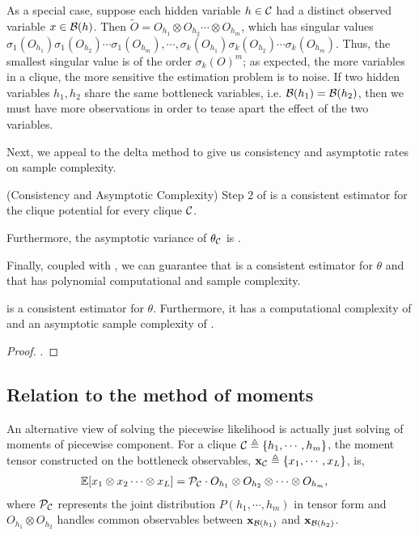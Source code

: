 As a special case, suppose each hidden variable $h \in \mathcal{C}$ had
  a distinct observed variable $x \in \mathcal{B}(h)$. 
Then $\tilde O = O_{h_1} \otimes O_{h_2} \cdots \otimes O_{h_m}$, which
  has singular values $\sigma_1(O_{h_1}) \sigma_1(O_{h_2}) \cdots
  \sigma_1(O_{h_m}), \cdots, \sigma_k(O_{h_1}) \sigma_k(O_{h_2}) \cdots
  \sigma_k(O_{h_m})$. 
Thus, the smallest singular value is of the order $\sigma_k(O)^m$; as
  expected, the more variables in a clique, the more sensitive the
  estimation problem is to noise.
If two hidden variables $h_1, h_2$ share the same bottleneck
  variables, i.e. $\mathcal{B}(h_1) = \mathcal{B}(h_2)$, then we must have more
  observations in order to tease apart the effect of the two
  variables\verify\reword.


Next, we appeal to the delta method to give us
  consistency and asymptotic rates on sample complexity.
\begin{corollary}(Consistency and Asymptotic Complexity)
  \label{cor:asymptotics}
  Step 2 of  is a consistent estimator for
  the clique potential for every clique $\mathcal{C}$.

  Furthermore, the asymptotic variance of $\theta_{\mathcal{C}}$ is
  .
\end{corollary}

Finally, coupled with , we can guarantee that
   is a consistent estimator for $\theta$ and 
  that has polynomial computational and sample complexity.
\begin{theorem}
   is a consistent estimator for $\theta$.
  Furthermore, it has a computational complexity of  and an
    asymptotic sample complexity of .
\end{theorem}
\begin{proof}
  .
\end{proof}

\subsection{Relation to the method of moments}

An alternative view of solving the piecewise likelihood is actually just
  solving of moments of piecewise component. 
For a clique $\mathcal{C} \triangleq \{h_1, \cdots, h_m\}$, the moment tensor
  constructed on the bottleneck observables, $\mathbf{x}_{\mathcal{C}} \triangleq \{x_1,
  \cdots, x_L\}$, is,
\begin{align}
  \mathbb{E}[ x_1 \otimes x_2 \cdots \otimes x_L ] &= \mathcal{P}_{\mathcal{C}} \cdot O_{h_1} \otimes O_{h_2} \otimes \cdots \otimes O_{h_m},
\end{align}
where $\mathcal{P}_{\mathcal{C}}$ represents the joint distribution $P(h_1, \cdots, h_m)$
  in tensor form and $O_{h_1} \otimes O_{h_2}$ handles common
  observables between $\mathbf{x}_{\mathcal{B}(h_1)}$ and $\mathbf{x}_{\mathcal{B}(h_2)}$.

